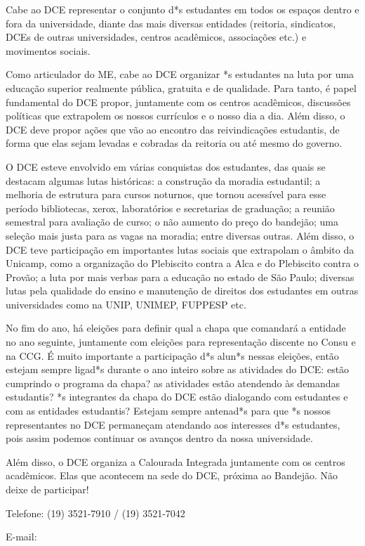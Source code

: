 Cabe ao DCE representar o conjunto d*s estudantes em todos os espaços dentro e
fora da universidade, diante das mais diversas entidades (reitoria, sindicatos,
DCEs de outras universidades, centros acadêmicos, associações etc.) e movimentos
sociais.

Como articulador do ME, cabe ao DCE organizar *s estudantes na luta por uma
educação superior realmente pública, gratuita e de qualidade. Para tanto, é
papel fundamental do DCE propor, juntamente com os centros acadêmicos,
discussões políticas que extrapolem os nossos currículos e o nosso dia a dia.
Além disso, o DCE deve propor ações que vão ao encontro das reivindicações
estudantis, de forma que elas sejam levadas e cobradas da reitoria ou até mesmo
do governo.

O DCE esteve envolvido em várias conquistas dos estudantes, das quais se
destacam algumas lutas históricas: a construção da moradia estudantil; a
melhoria de estrutura para cursos noturnos, que tornou acessível para esse
período bibliotecas, xerox, laboratórios e secretarias de graduação; a reunião
semestral para avaliação de curso; o não aumento do preço do bandejão; uma
seleção mais justa para as vagas na moradia; entre diversas outras. Além disso,
o DCE teve participação em importantes lutas sociais que extrapolam o âmbito da
Unicamp, como a organização do Plebiscito contra a Alca e do Plebiscito contra o
Provão; a luta por mais verbas para a educação no estado de São Paulo; diversas
lutas pela qualidade do ensino e manutenção de direitos dos estudantes em outras
universidades como na UNIP, UNIMEP, FUPPESP etc.

No fim do ano, há eleições para definir qual a chapa que comandará a entidade no
ano seguinte, juntamente com eleições para representação discente no Consu e na
CCG. É muito importante a participação d*s alun*s nessas eleições, então estejam
sempre ligad*s durante o ano inteiro sobre as atividades do DCE: estão cumprindo
o programa da chapa? as atividades estão atendendo às demandas estudantis?  *s
integrantes da chapa do DCE estão dialogando com estudantes e com as entidades
estudantis?  Estejam sempre antenad*s para que *s nossos representantes no DCE
permaneçam atendando aos interesses d*s estudantes, pois assim podemos continuar
os avanços dentro da nossa universidade.

Além disso, o DCE organiza a Calourada Integrada juntamente com os centros
acadêmicos. Elas que acontecem na sede do DCE, próxima ao Bandejão. Não deixe
de participar!

\begin{compactitemize}
    \item  Telefone: (19) 3521-7910 / (19) 3521-7042
    \item  E-mail: 
\end{compactitemize}

